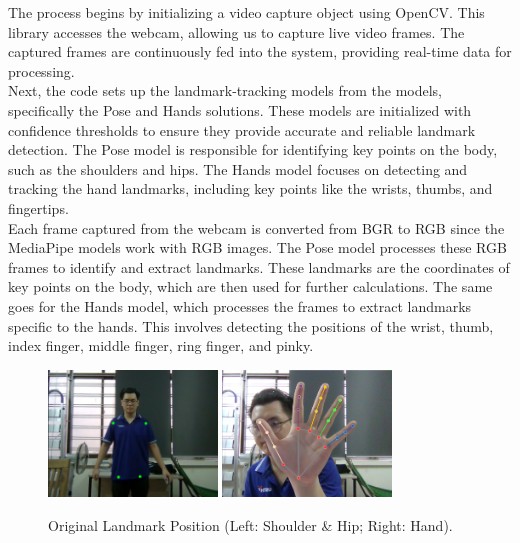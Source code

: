 \documentclass[12pt]{article}
\begin{document}
The process begins by initializing a video capture object using OpenCV. This library accesses the webcam, allowing us to capture live video frames. The captured frames are continuously fed into the system, providing real-time data for processing. \\

Next, the code sets up the landmark-tracking models from the models, specifically the Pose and Hands solutions. These models are initialized with confidence thresholds to ensure they provide accurate and reliable landmark detection. The Pose model is responsible for identifying key points on the body, such as the shoulders and hips. The Hands model focuses on detecting and tracking the hand landmarks, including key points like the wrists, thumbs, and fingertips.\\

Each frame captured from the webcam is converted from BGR to RGB since the MediaPipe models work with RGB images. The Pose model processes these RGB frames to identify and extract landmarks. These landmarks are the coordinates of key points on the body, which are then used for further calculations.
The same goes for the Hands model, which processes the frames to extract landmarks specific to the hands. This involves detecting the positions of the wrist, thumb, index finger, middle finger, ring finger, and pinky.\\

\begin{figure}[ht]
    \centering
    \includegraphics[width=0.4\textwidth]{pose1.png}
    \includegraphics[width=0.4\textwidth]{hand3.png}
    \caption{Original Landmark Position (Left: Shoulder \& Hip; Right: Hand).}
\end{figure}
\end{document}
